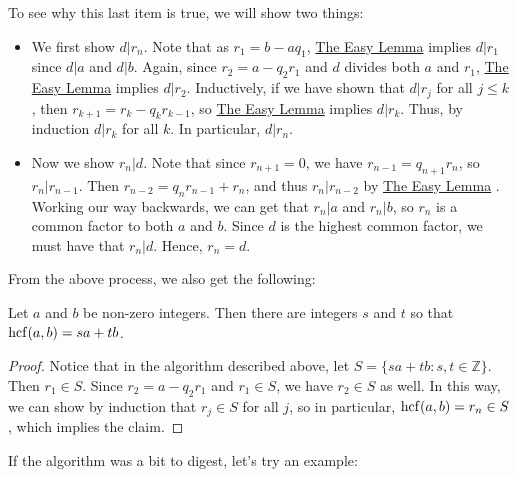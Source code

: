 \documentclass[11pt,dvipsnames]{book}
\def\hcf{{\rm hcf}}
\numberwithin{equation}{section} %
\numberwithin{figure}{section} %
\numberwithin{table}{section} %
\begin{document}
To see why this last item is true, we will show two things:

\begin{itemize}
\item We first show $d|r_{n}$. Note that as $r_{1}=b-aq_{1}$, \hyperref[l:easy-lemma]{The Easy Lemma}  implies $d|r_{1}$ since $d|a$ and $d|b$. Again, since $r_{2}=a-q_{2}r_{1}$ and $d$ divides both $a$ and $r_{1}$, \hyperref[l:easy-lemma]{The Easy Lemma}  implies $d|r_{2}$. Inductively, if we have shown that $d|r_{j}$ for all $j\leq k$, then $r_{k+1}=r_{k}-q_{k}r_{k-1}$, so \hyperref[l:easy-lemma]{The Easy Lemma}  implies $d|r_{k}$. Thus, by induction $d|r_{k}$ for all $k$. In particular, $d|r_{n}$. 
\item Now we show $r_{n}|d$. Note that since $r_{n+1}=0$, we have $r_{n-1}=q_{n+1}r_{n}$, so $r_{n}|r_{n-1}$. Then $r_{n-2}=q_{n}r_{n-1}+r_{n}$, and thus $r_{n}|r_{n-2}$ by \hyperref[l:easy-lemma]{The Easy Lemma} . Working our way backwards, we can get that $r_{n}|a$ and $r_n|b$, so $r_{n}$ is a common factor to both $a$ and $b$. Since $d$ is the highest common factor, we must have that $r_{n}|d$. Hence, $r_{n}=d$. 
\end{itemize}

From the above process, we also get the following:


\begin{theorem}
\label{t:lincombhcf}
 Let $a$ and $b$ be non-zero integers. Then there are integers $s$ and $t$ so that $\hcf(a,b)=sa+tb$. 
\end{theorem}

\begin{proof}
Notice that in the algorithm described above, let $S=\{sa+tb:s,t\in\mathbb{Z}\}$. Then $r_{1}\in S$. Since $r_{2}=a-q_{2}r_{1}$ and $r_{1}\in S$, we have $r_{2}\in S$ as well. In this way, we can show by induction that $r_{j}\in S$ for all $j$, so in particular, $\hcf(a,b)=r_{n}\in S$, which implies the claim.
\end{proof}





If the algorithm was a bit to digest, let's try an example:
\end{document}
